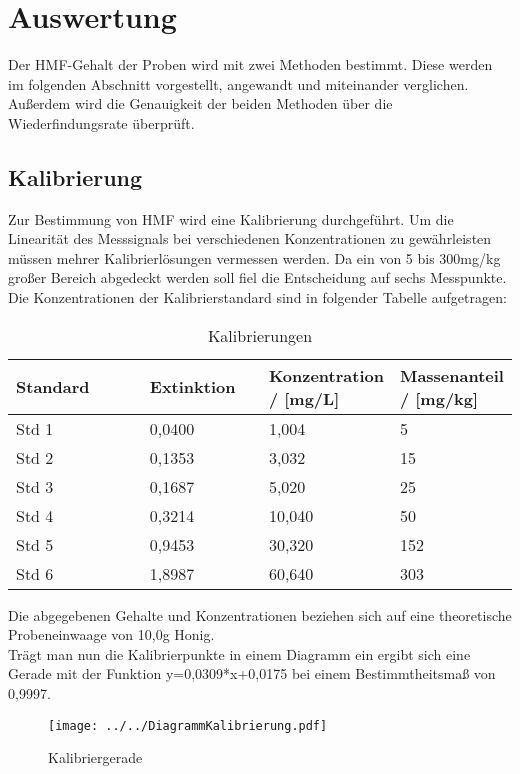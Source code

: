 \chapter{Auswertung}
Der HMF-Gehalt der Proben wird mit zwei Methoden bestimmt. Diese werden im folgenden Abschnitt vorgestellt, angewandt und miteinander verglichen. Außerdem wird die Genauigkeit der beiden Methoden über die Wiederfindungsrate überprüft.
\section{Kalibrierung}
Zur Bestimmung von HMF wird eine Kalibrierung durchgeführt. Um die Linearität des Messsignals bei verschiedenen Konzentrationen zu gewährleisten müssen mehrer Kalibrierlösungen vermessen werden. Da ein von 5 bis 300mg/kg großer Bereich abgedeckt werden soll fiel die Entscheidung auf sechs Messpunkte. Die Konzentrationen der Kalibrierstandard sind in folgender Tabelle aufgetragen:

\begin{table}[htbp]
	\centering
		\begin{tabular}{p{0.30\linewidth}|p{0.25\linewidth}|p{0.25\linewidth}|p{0.2\linewidth}}
			Standard & Extinktion & Konzentration / [mg/L] &  Massenanteil / [mg/kg]\\
			\hline
			Std 1 & 0,0400 & 1,004 & 5\\
			\hline
			Std 2 & 0,1353 & 3,032 & 15\\
			\hline
			Std 3 & 0,1687 & 5,020 & 25\\
			\hline
			Std 4 & 0,3214 & 10,040 & 50\\
			\hline
			Std 5 & 0,9453 & 30,320 & 152\\
			\hline
			Std 6 & 1,8987 & 60,640 & 303
		\end{tabular}
	\caption{Kalibrierungen}
	\label{tab:Kalibrierungen}
\end{table}

Die abgegebenen Gehalte und Konzentrationen beziehen sich auf eine theoretische Probeneinwaage von 10,0g Honig.\\
Trägt man nun die Kalibrierpunkte in einem Diagramm ein ergibt sich eine Gerade mit der Funktion y=0,0309*x+0,0175 bei einem Bestimmtheitsmaß von 0,9997.

\begin{figure}[htbp]
	\centering
		\texttt{[image: ../../DiagrammKalibrierung.pdf]}
	\caption{Kalibriergerade}
	\label{fig:DiagrammKalibrierung}
\end{figure}

